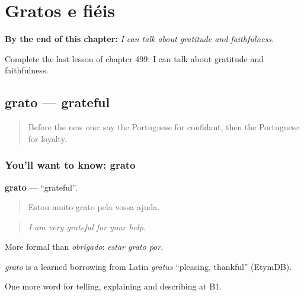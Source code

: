 
\chapter{Gratos e fiéis}
\label{ch:pt-gratos-e-fieis}

\begin{chapteropening}
\textbf{By the end of this chapter:} \emph{I can talk about gratitude and faithfulness.}

Complete the last lesson of chapter 499: I can talk about gratitude and faithfulness.
\end{chapteropening}

\section[grato]{grato — grateful}

\label{lesson:PT-C499-grato}



\begin{quote}
Before the new one: say the Portuguese for confidant, then the Portuguese for loyalty.
\end{quote}

\subsection*{You'll want to know: grato}
\textbf{grato} — \textquotedblleft{}grateful\textquotedblright{}.

\begin{quote}
Estou muito grato pela vossa ajuda.
\end{quote}

\begin{quote}
\emph{I am very grateful for your help.}
\end{quote}

More formal than \emph{obrigado}: \emph{estar grato por}.

\begin{cousinweb}
\emph{grato} is a learned borrowing from Latin \emph{grātus} \textquotedblleft{}pleasing, thankful\textquotedblright{} (EtymDB).
\end{cousinweb}

\begin{grammarlens}[title={What you've built}]
One more word for telling, explaining and describing at B1.
\end{grammarlens}

